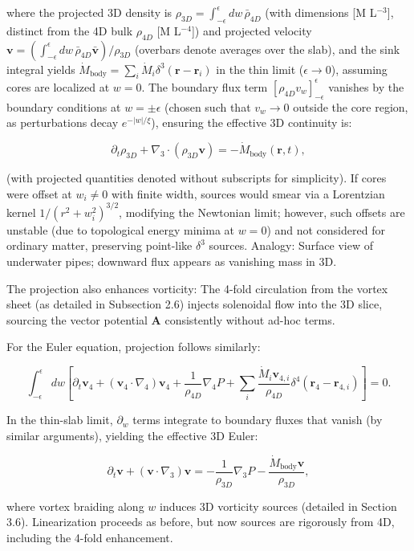 where the projected 3D density is $\rho_{3D} = \int_{-\epsilon}^{\epsilon} dw \, \bar{\rho}_{4D}$ (with dimensions [M L$^{-3}$], distinct from the 4D bulk $\rho_{4D}$ [M L$^{-4}$]) and projected velocity $\mathbf{v} = \left( \int_{-\epsilon}^{\epsilon} dw \, \bar{\rho}_{4D} \bar{\mathbf{v}} \right) / \rho_{3D}$ (overbars denote averages over the slab), and the sink integral yields $\dot{M}_{\text{body}} = \sum_i \dot{M}_i \delta^3(\mathbf{r} - \mathbf{r}_i)$ in the thin limit ($\epsilon \to 0$), assuming cores are localized at $w=0$. The boundary flux term $[\rho_{4D} v_w]_{-\epsilon}^{\epsilon}$ vanishes by the boundary conditions at $w = \pm \epsilon$ (chosen such that $v_w \to 0$ outside the core region, as perturbations decay $e^{-|w|/ \xi}$), ensuring the effective 3D continuity is:

\[
\partial_t \rho_{3D} + \nabla_3 \cdot (\rho_{3D} \mathbf{v}) = - \dot{M}_{\text{body}}(\mathbf{r}, t),
\]

(with projected quantities denoted without subscripts for simplicity). If cores were offset at $w_i \neq 0$ with finite width, sources would smear via a Lorentzian kernel $1/(r^2 + w_i^2)^{3/2}$, modifying the Newtonian limit; however, such offsets are unstable (due to topological energy minima at $w=0$) and not considered for ordinary matter, preserving point-like $\delta^3$ sources. Analogy: Surface view of underwater pipes; downward flux appears as vanishing mass in 3D.

The projection also enhances vorticity: The 4-fold circulation from the vortex sheet (as detailed in Subsection 2.6) injects solenoidal flow into the 3D slice, sourcing the vector potential $\mathbf{A}$ consistently without ad-hoc terms.

For the Euler equation, projection follows similarly:

\[
\int_{-\epsilon}^{\epsilon} dw \left[ \partial_t \mathbf{v}_4 + (\mathbf{v}_4 \cdot \nabla_4) \mathbf{v}_4 + \frac{1}{\rho_{4D}} \nabla_4 P + \sum_i \frac{\dot{M}_i \mathbf{v}_{4,i}}{\rho_{4D}} \delta^4(\mathbf{r}_4 - \mathbf{r}_{4,i}) \right] = 0.
\]

In the thin-slab limit, $\partial_w$ terms integrate to boundary fluxes that vanish (by similar arguments), yielding the effective 3D Euler:

\[
\partial_t \mathbf{v} + (\mathbf{v} \cdot \nabla_3) \mathbf{v} = -\frac{1}{\rho_{3D}} \nabla_3 P - \frac{\dot{M}_{\text{body}} \mathbf{v}}{\rho_{3D}},
\]

where vortex braiding along $w$ induces 3D vorticity sources (detailed in Section 3.6). Linearization proceeds as before, but now sources are rigorously from 4D, including the 4-fold enhancement.

